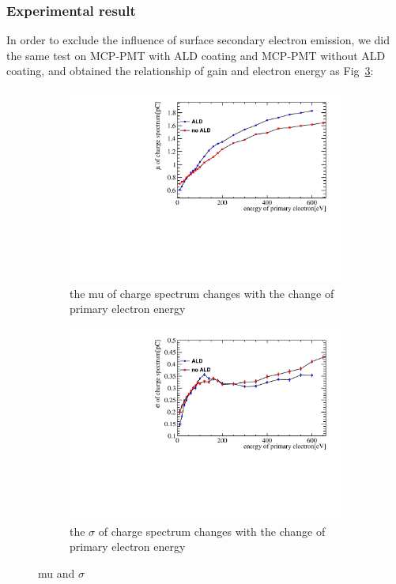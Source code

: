 \documentclass{article}
\begin{document}
\subsubsection{Experimental result}
In order to exclude the influence of surface secondary electron emission,
we did the same test on MCP-PMT with ALD coating and MCP-PMT without ALD coating,
and obtained the relationship of gain and electron energy as Fig~\ref{fig:gaintest}:
\begin{figure}[htbp]
    \centering
    \begin{subfigure}[b]{0.45\textwidth}
        \includegraphics[width=\textwidth]{pic/gain.h5_mu.pdf}
        \caption{the mu of charge spectrum changes with the change of primary electron energy}
        \label{fig:gain}
    \end{subfigure}
    \begin{subfigure}[b]{0.45\textwidth}
        \includegraphics[width=\textwidth]{pic/gain.h5_sigma.pdf}
        \caption{the $\sigma$ of charge spectrum changes with the change of primary electron energy}
        \label{fig:sigma}
    \end{subfigure}
    \caption{mu and $\sigma$ }
    \label{fig:gaintest}
\end{figure}
\end{document}
